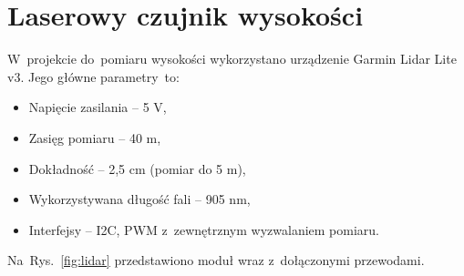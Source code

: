 \section{Laserowy czujnik wysokości}
\label{sec:laser}
W~projekcie do~pomiaru wysokości wykorzystano urządzenie Garmin Lidar Lite v3. Jego główne parametry~to:
\begin{itemize}
	\item Napięcie zasilania -- 5 V,
	\item Zasięg pomiaru -- 40 m,
	\item Dokładność -- 2,5 cm (pomiar do 5 m), 
	\item Wykorzystywana długość fali -- 905 nm,
	\item Interfejsy -- I2C, PWM z~zewnętrznym wyzwalaniem pomiaru.
\end{itemize}
Na~Rys.~\ref{fig:lidar} przedstawiono moduł wraz z~dołączonymi przewodami.
